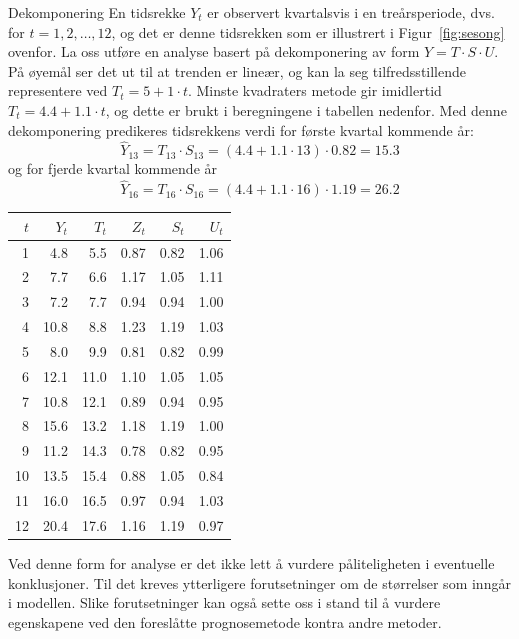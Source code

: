 \begin{eksempel}{Dekomponering}
En tidsrekke $Y_t$ er observert kvartalsvis i en treårsperiode, dvs. for
$t = 1, 2, \ldots, 12$, og det er denne tidsrekken som er illustrert i Figur~\ref{fig:sesong}
ovenfor.  La oss utføre en analyse basert på dekomponering av form
$Y = T \cdot S \cdot U$.  På øyemål ser det ut til at trenden er
lineær, og kan la seg tilfredsstillende representere ved $T_t = 5 + 1
\cdot t$.  Minste kvadraters metode gir imidlertid $T_t = 4.4 + 1.1 \cdot t$,
og dette er brukt i beregningene i tabellen nedenfor.
Med denne dekomponering predikeres tidsrekkens verdi for
første kvartal kommende år:
\[ \hat{Y}_{13}=T_{13} \cdot S_{13}=(4.4+1.1 \cdot 13) \cdot 0.82=15.3   \]
\noindent og for fjerde kvartal kommende år
\[ \hat{Y}_{16}=T_{16} \cdot S_{16}=(4.4+1.1 \cdot 16) \cdot 1.19=26.2  \] 
\begin{tabular}{|rr|rrrr|} \hline
 $t$ &   $Y_t$    &     $T_t$   &    $Z_t$   &     $S_t$  &   $U_t$  \\ \hline
  1  &    4.8     &      5.5    &     0.87   &     0.82   &     1.06   \\
  2  &    7.7     &      6.6    &     1.17   &     1.05   &     1.11   \\
  3  &    7.2     &      7.7    &     0.94   &     0.94   &     1.00   \\
  4  &   10.8     &      8.8    &     1.23   &     1.19   &     1.03   \\
  5  &    8.0     &      9.9    &     0.81   &     0.82   &     0.99   \\
  6  &   12.1     &     11.0    &     1.10   &     1.05   &     1.05   \\
  7  &   10.8     &     12.1    &     0.89   &     0.94   &     0.95   \\
  8  &   15.6     &     13.2    &     1.18   &     1.19   &     1.00   \\
  9  &   11.2     &     14.3    &     0.78   &     0.82   &     0.95   \\
 10  &   13.5     &     15.4    &     0.88   &     1.05   &     0.84   \\
 11  &   16.0     &     16.5    &     0.97   &     0.94   &     1.03   \\
 12  &   20.4     &     17.6    &     1.16   &     1.19   &     0.97 \\ \hline
\end{tabular} 
\end{eksempel}
Ved denne form for analyse er det ikke lett å vurdere
påliteligheten i eventuelle konklusjoner.  Til det kreves ytterligere
forutsetninger om de størrelser som inngår i modellen. 
Slike forutsetninger kan også sette
oss i stand til å vurdere egenskapene ved den foreslåtte 
prognosemetode kontra andre metoder.

